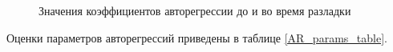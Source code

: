 \documentclass[12pt,a4paper]{article}
\begin{document}
\begin{figure}[h]
\begin{minipage}[h]{0.49\linewidth}
\end{minipage}
\begin{minipage}[h]{0.49\linewidth}
\end{minipage}
\caption{Значения коэффициентов авторегрессии до и во время разладки}
\label{autoregr_params}
\end{figure}
Оценки параметров авторегрессий приведены в таблице \ref{AR_params_table}.
\end{document}
